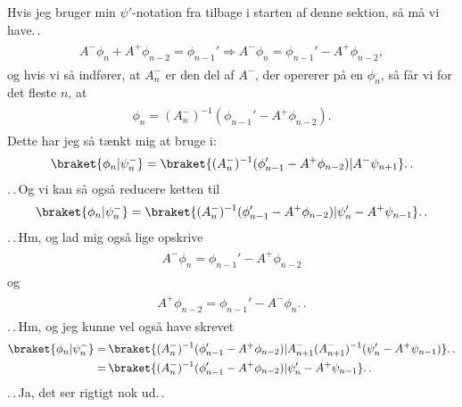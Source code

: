 \documentclass{report}
\begin{document}
Hvis jeg bruger min $\psi'$-notation fra tilbage i starten af denne sektion, så må vi have.\,.
\begin{align}
\begin{aligned}
	A^- \phi_n + A^+\phi_{n-2} = \phi_{n-1}' \Longrightarrow
	A^- \phi_n = \phi_{n-1}' - A^+\phi_{n-2},
\end{aligned}
\end{align}
og hvis vi så indfører, at $A^-_n$ er den del af $A^-$, der opererer på en $\phi_n$, så får vi for det fleste $n$, at
\begin{align}
\begin{aligned}
	\phi_n = (A^-_n)^{-1} (\phi_{n-1}' - A^+\phi_{n-2}).
	\label{reduce_phi_n1}
\end{aligned}
\end{align}
Dette har jeg så tænkt mig at bruge i:
\begin{align}
\begin{aligned}
	\braket{\phi_n | \psi_{n}^-} = \braket{(A^-_n)^{-1} (\phi_{n-1}' - A^+\phi_{n-2}) | A^- \psi_{n+1}}.\,.
\end{aligned}
\end{align}
.\,.\,Og vi kan så også reducere ketten til
\begin{align}
\begin{aligned}
	\braket{\phi_n | \psi_{n}^-} = \braket{(A^-_n)^{-1} (\phi_{n-1}' - A^+\phi_{n-2}) | 
		\psi_{n}' - A^+\psi_{n-1}}.\,.
\end{aligned}
\end{align}
.\,.\,Hm, og lad mig også lige opskrive 
\begin{align}
\begin{aligned}
	A^- \phi_n = \phi_{n-1}' - A^+\phi_{n-2}
\end{aligned}
\end{align}
og
\begin{align}
\begin{aligned}
	A^+\phi_{n-2} = \phi_{n-1}' - A^- \phi_n.\,.
\end{aligned}
\end{align}
.\,.\,Hm, og jeg kunne vel også have skrevet
\begin{align}
\begin{aligned}
	\braket{\phi_n | \psi_{n}^-} =&\, 
		\braket{(A^-_n)^{-1} (\phi_{n-1}' - A^+\phi_{n-2}) | 
			A^-_{n+1} (A^-_{n+1})^{-1} (\psi_{n}' - A^+\psi_{n-1})}.\,. \\
	=&\, 
		\braket{(A^-_n)^{-1} (\phi_{n-1}' - A^+\phi_{n-2}) | 
			\psi_{n}' - A^+\psi_{n-1}}.\,. \\
\end{aligned}
\end{align}
.\,.\,Ja, det ser rigtigt nok ud.\,. 
\end{document}

